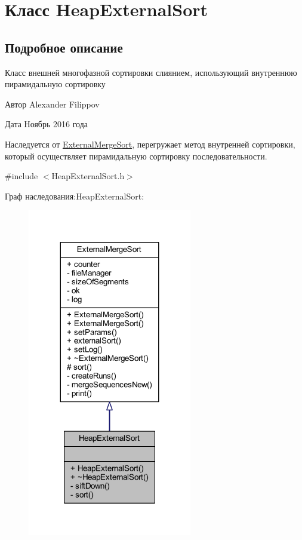 \hypertarget{class_heap_external_sort}{}\section{Класс Heap\+External\+Sort}
\label{class_heap_external_sort}


\subsection{Подробное описание}
Класс внешней многофазной сортировки слиянием, использующий внутреннюю пирамидальную сортировку 

\begin{DoxyAuthor}{Автор}
Alexander Filippov 
\end{DoxyAuthor}
\begin{DoxyDate}{Дата}
Ноябрь 2016 года
\end{DoxyDate}
Наследуется от \hyperlink{class_external_merge_sort}{External\+Merge\+Sort}, перегружает метод внутренней сортировки, который осуществляет пирамидальную сортировку последовательности. 

{\ttfamily \#include $<$Heap\+External\+Sort.\+h$>$}



Граф наследования\+:Heap\+External\+Sort\+:\nopagebreak
\begin{figure}[H]
\begin{center}
\leavevmode
\includegraphics[width=203pt]{class_heap_external_sort__inherit__graph}
\end{center}
\end{figure}


